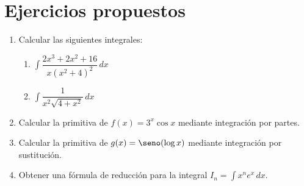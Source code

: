 \section{Ejercicios propuestos}
\begin{enumerate}[leftmargin=*]
\item Calcular las siguientes integrales:
\begin{enumerate}
\item $ \int{\dfrac{2x^{3}+2x^{2}+16}{x(x^{2}+4)^{2}}\,dx}$
\item $ \int{\dfrac{1}{x^{2}\sqrt{4+x^{2}}}\,dx}$
\end{enumerate}
\item Calcular la primitiva de $f(x)=3^{x}\cos{x}$ mediante integración por partes.
\item Calcular la primitiva de $g(x)=\seno({\log{x}})$ mediante integración por sustitución.
\item Obtener una fórmula de reducción para la integral $I_{n}=\int{x^{n}e^{x}\,dx}$.
\end{enumerate}